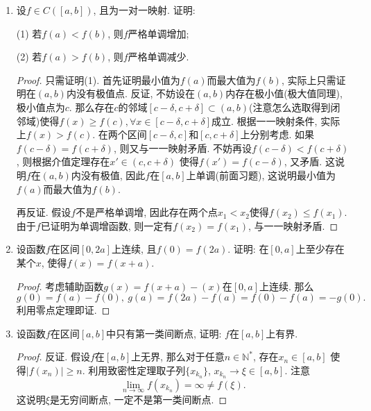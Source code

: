 \documentclass[UTF8,11pt, a4paper, oneside, fontset=none]{ctexbook}
\begin{document}
\begin{enumerate}
\begin{proof}
\end{proof}


\item 设$f \in C([a, b])$, 且为一对一映射. 证明:

(1) 若$f(a)<f(b)$, 则$f$严格单调增加;

(2) 若$f(a)>f(b)$, 则$f$严格单调减少.


\begin{proof}

只需证明(1). 首先证明最小值为$f(a)$而最大值为$f(b)$, 实际上只需证明在$(a, b)$内没有极值点. 反证, 不妨设在$(a, b)$内存在极小值(极大值同理), 极小值点为$c$. 那么存在$c$的邻域$[c-\delta, c+\delta] \subset (a, b)$(注意怎么选取得到闭邻域)使得$f(x) \geq f(c), \forall x \in [c-\delta, c+\delta]$成立. 根据一一映射条件, 实际上$f(x) > f(c)$. 在两个区间$[c-\delta, c]$和$[c, c+\delta]$上分别考虑. 如果$f(c-\delta) = f(c+\delta)$, 则又与一一映射矛盾. 不妨再设$f(c-\delta) < f(c+\delta)$, 则根据介值定理存在$x' \in (c, c+\delta)$ 使得$f(x') = f(c-\delta)$, 又矛盾. 这说明$f$在$(a, b)$内没有极值, 因此$f$在$[a, b]$上单调(前面习题), 这说明最小值为$f(a)$而最大值为$f(b)$.

再反证. 假设$f$不是严格单调增, 因此存在两个点$x_1 < x_2$使得$f(x_2) \leq f(x_1)$. 由于$f$已证明为单调增函数, 则一定有$f(x_2) = f(x_1)$, 与一一映射矛盾. 


\end{proof}


\item 设函数$f$在区间$[0, 2a]$上连续, 且$f(0) = f(2a)$. 证明: 在$[0, a]$上至少存在某个$x$, 使得$f(x) = f(x+a)$.


\begin{proof}

考虑辅助函数$g(x) = f(x+a) - (x)$在$[0, a]$上连续. 那么
\[
g(0) =f(a) - f(0), \ g(a) = f(2a) - f(a) = f(0)- f(a) =  - g(0).
\]
利用零点定理即证.


\end{proof}

\item 设函数$f$在区间$[a, b]$中只有第一类间断点, 证明: $f$在$[a, b]$上有界.

\begin{proof}

反证. 假设$f$在$[a, b]$上无界, 那么对于任意$n \in \mathbb N^*$, 存在$x_n \in [a, b]$ 使得$|f(x_n)| \geq n$.
利用致密性定理取子列$\{ x_{k_n} \}$, $x_{k_n} \to \xi \in [a, b]$. 注意
\[
\lim_{n \to \infty} f(x_{k_n}) = \infty \neq f(\xi).
\]
这说明$\xi$是无穷间断点, 一定不是第一类间断点.


\end{proof}
\end{enumerate}
\end{document}
